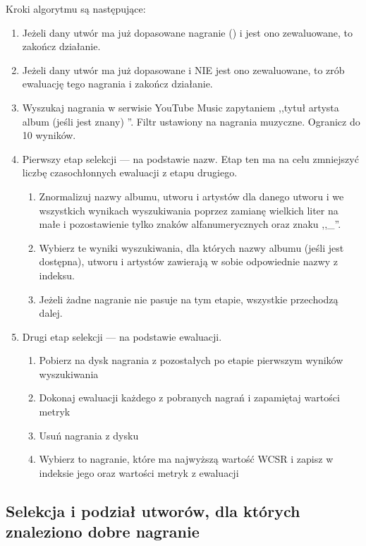 Kroki algorytmu są następujące:
\begin{enumerate}
    \item Jeżeli dany utwór ma już dopasowane nagranie () i jest ono zewaluowane, to
        zakończ działanie.
    \item Jeżeli dany utwór ma już dopasowane  i NIE jest ono zewaluowane, to zrób
        ewaluację tego nagrania i zakończ działanie.
    \item Wyszukaj nagrania w serwisie YouTube Music zapytaniem ,,tytuł artysta album (jeśli jest
        znany) ''. Filtr ustawiony na nagrania muzyczne. Ogranicz do 10 wyników.
    \item Pierwszy etap selekcji --- na podstawie nazw. Etap ten ma na celu zmniejszyć liczbę
        czasochłonnych ewaluacji z etapu drugiego. 
        \begin{enumerate}
            \item Znormalizuj nazwy albumu, utworu i artystów dla danego utworu i we wszystkich
                wynikach wyszukiwania poprzez zamianę wielkich liter na małe i pozostawienie tylko
                znaków alfanumerycznych oraz znaku ,,\_''.
            \item Wybierz te wyniki wyszukiwania, dla których nazwy albumu (jeśli jest
                dostępna), utworu i artystów zawierają w sobie odpowiednie nazwy z indeksu.
            \item Jeżeli żadne nagranie nie pasuje na tym etapie, wszystkie przechodzą dalej.
        \end{enumerate}
    \item Drugi etap selekcji --- na podstawie ewaluacji.
        \begin{enumerate}
            \item Pobierz na dysk nagrania z pozostałych po etapie pierwszym wyników wyszukiwania
            \item Dokonaj ewaluacji każdego z pobranych nagrań i zapamiętaj wartości metryk
            \item Usuń nagrania z dysku
            \item Wybierz to nagranie, które ma najwyższą wartość WCSR i zapisz w indeksie jego
                 oraz wartości metryk z ewaluacji
        \end{enumerate}
\end{enumerate}

\subsection{Selekcja i podział utworów, dla których znaleziono dobre nagranie}

